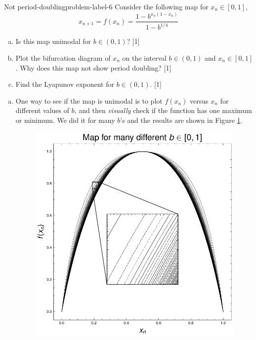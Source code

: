 \begin{problem}{Not period-doubling}{problem-label-6}
Consider the following map for $x_n \in [0,1],$
\[
    x_{n+1} = f(x_n) = \frac{1-b^{x_n(1-x_n)}}{1-b^{1/4}}
\]
\begin{enumerate}[(a)]
    \item Is this map unimodal for $b \in (0,1)$? [1]
    \item Plot the bifurcation diagram of $x_n$ on the interval $b \in (0,1)$ and $x_n \in [0,1]$.
    Why does this map not show period doubling? [1]
    \item Find the Lyapunov exponent for $b \in (0,1)$. [1]
\end{enumerate}
\end{problem}

\begin{enumerate}[(a)]
    \item One way to see if the map is unimodal is to plot $f(x_n)$ versus $x_n$ for different values
    of $b$, and then \textit{visually} check if the function has one maximum or minimum. We did it
    for many $b$'s and the results are shown in Figure \ref{fig:3a}.
    \begin{figure}[!ht]
        \centering
        \includegraphics[scale=0.65]{images/unimodal.pdf}
        \label{fig:3a}
    \end{figure}


\end{enumerate}
